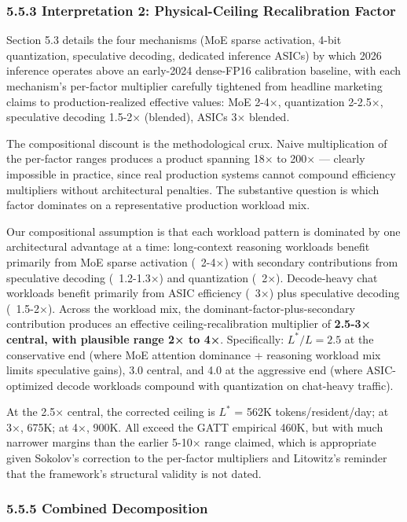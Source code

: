 \documentclass[11pt,a4paper]{article}
\begin{document}
\subsubsection{5.5.3 Interpretation 2: Physical-Ceiling Recalibration Factor}

Section 5.3 details the four mechanisms (MoE sparse activation, 4-bit quantization, speculative decoding, dedicated inference ASICs) by which 2026 inference operates above an early-2024 dense-FP16 calibration baseline, with each mechanism's per-factor multiplier carefully tightened from headline marketing claims to production-realized effective values: MoE 2-4×, quantization 2-2.5×, speculative decoding 1.5-2× (blended), ASICs 3× blended.

The compositional discount is the methodological crux. Naive multiplication of the per-factor ranges produces a product spanning 18× to 200× --- clearly impossible in practice, since real production systems cannot compound efficiency multipliers without architectural penalties. The substantive question is which factor dominates on a representative production workload mix.

Our compositional assumption is that each workload pattern is dominated by one architectural advantage at a time: long-context reasoning workloads benefit primarily from MoE sparse activation (~2-4×) with secondary contributions from speculative decoding (~1.2-1.3×) and quantization (~2×). Decode-heavy chat workloads benefit primarily from ASIC efficiency (~3×) plus speculative decoding (~1.5-2×). Across the workload mix, the dominant-factor-plus-secondary contribution produces an effective ceiling-recalibration multiplier of \textbf{2.5-3× central, with plausible range 2× to 4×}. Specifically: $L^{*}/L = 2.5$ at the conservative end (where MoE attention dominance + reasoning workload mix limits speculative gains), 3.0 central, and 4.0 at the aggressive end (where ASIC-optimized decode workloads compound with quantization on chat-heavy traffic).

At the 2.5× central, the corrected ceiling is $L^{*}$ = 562K tokens/resident/day; at 3×, 675K; at 4×, 900K. All exceed the GATT empirical 460K, but with much narrower margins than the earlier 5-10× range claimed, which is appropriate given Sokolov's correction to the per-factor multipliers and Litowitz's reminder that the framework's structural validity is not dated.

\subsubsection{5.5.5 Combined Decomposition}
\end{document}
